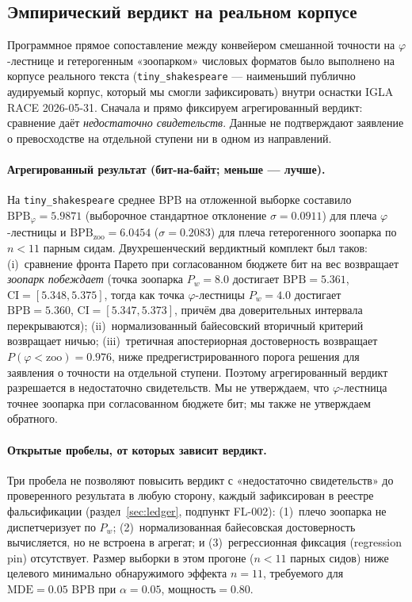 \documentclass[11pt,a4paper]{article}
\theoremstyle{plain}
\begin{document}
\subsection{Эмпирический вердикт на реальном корпусе}\label{sec:hw-realcorpus}

Программное прямое сопоставление между конвейером смешанной точности на
\(\varphi\)-лестнице и гетерогенным «зоопарком» числовых форматов было выполнено
на корпусе реального текста (\texttt{tiny\_shakespeare} --- наименьший публично
аудируемый корпус, который мы смогли зафиксировать) внутри оснастки IGLA RACE
2026-05-31. Сначала и прямо фиксируем агрегированный вердикт: сравнение даёт
\emph{недостаточно свидетельств}. Данные не подтверждают заявление о
превосходстве на отдельной ступени ни в одном из направлений.

\paragraph{Агрегированный результат (бит-на-байт; меньше --- лучше).}
На \texttt{tiny\_shakespeare} среднее BPB на отложенной выборке составило
\(\mathrm{BPB}_{\varphi} = 5.9871\) (выборочное стандартное отклонение
\(\sigma = 0.0911\)) для плеча \(\varphi\)-лестницы и
\(\mathrm{BPB}_{\mathrm{zoo}} = 6.0454\) (\(\sigma = 0.2083\)) для плеча
гетерогенного зоопарка по \(n < 11\) парным сидам. Двухрешенческий вердиктный
комплект был таков: (i)~сравнение фронта Парето при согласованном бюджете бит на
вес возвращает \emph{зоопарк побеждает} (точка зоопарка \(P_w = 8.0\) достигает
\(\mathrm{BPB} = 5.361\), \(\mathrm{CI} = [5.348, 5.375]\), тогда как точка
\(\varphi\)-лестницы \(P_w = 4.0\) достигает \(\mathrm{BPB} = 5.360\),
\(\mathrm{CI} = [5.347, 5.373]\), причём два доверительных интервала
перекрываются); (ii)~нормализованный байесовский вторичный критерий возвращает
ничью; (iii)~третичная апостериорная достоверность возвращает
\(P(\varphi < \mathrm{zoo}) = 0.976\), ниже предрегистрированного порога
решения для заявления о точности на отдельной ступени. Поэтому агрегированный
вердикт разрешается в недостаточно свидетельств. Мы не утверждаем, что
\(\varphi\)-лестница точнее зоопарка при согласованном бюджете бит; мы также не
утверждаем обратного.

\paragraph{Открытые пробелы, от которых зависит вердикт.}
Три пробела не позволяют повысить вердикт с «недостаточно свидетельств» до
проверенного результата в любую сторону, каждый зафиксирован в реестре
фальсификации (раздел~\ref{sec:ledger}, подпункт FL-002):
(1)~плечо зоопарка не диспетчеризует по \(P_w\);
(2)~нормализованная байесовская достоверность вычисляется, но не встроена в
агрегат; и
(3)~регрессионная фиксация (regression pin) отсутствует. Размер выборки в этом
прогоне (\(n < 11\) парных сидов) ниже целевого минимально обнаружимого эффекта
\(n = 11\), требуемого для \(\mathrm{MDE} = 0.05\) BPB при \(\alpha = 0.05\),
\(\text{мощность} = 0.80\).
\end{document}
